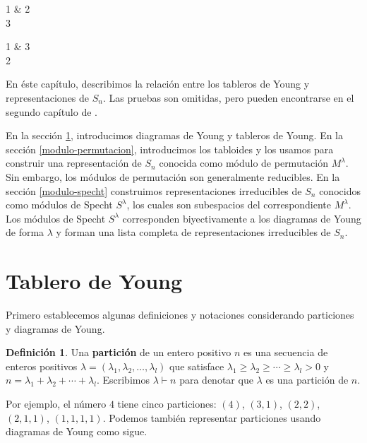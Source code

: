\documentclass[12pt]{book}
\theoremstyle{definition}
\newtheorem{definition}[theorem]{Definición}
\newcounter{in}
\newcounter{ini}
\begin{document}
\begin{center}
  \begin{ytableau}
    1 & 2\\
    3
  \end{ytableau} \qquad
  \begin{ytableau}
    1 & 3\\
    2
  \end{ytableau}
\end{center}

En éste capítulo, describimos la relación entre los tableros de Young
y representaciones de $S_{n}$. Las pruebas son omitidas, pero pueden
encontrarse en el segundo capítulo de \cite{sagan2001symmetric}.

En la sección \ref{tablero}, introducimos diagramas de Young y tableros
de Young. En la sección \ref{modulo-permutacion}, introducimos los
tabloides y los usamos para construir una representación de $S_{n}$
conocida como módulo de permutación $M^{\lambda}$. Sin embargo, los
módulos de permutación son generalmente reducibles. En la sección
\ref{modulo-specht} construimos representaciones irreducibles de
$S_{n}$ conocidos como módulos de Specht $S^{\lambda}$, los cuales son
subespacios del correspondiente $M^{\lambda}$. Los módulos de
Specht $S^{\lambda}$ corresponden biyectivamente a los diagramas de
Young de forma $\lambda$ y forman una lista completa de
representaciones irreducibles de $S_{n}$.

\section{Tablero de Young}
\label{tablero}

Primero establecemos algunas definiciones y notaciones
considerando particiones y diagramas de Young.

\begin{definition}
  Una \textbf{partición} de un entero positivo $n$ es una secuencia de
  enteros positivos
  $\lambda=(\lambda_{1},\lambda_{2},\ldots,\lambda_{l})$ que satisface
  $\lambda_{1}\geq\lambda_{2}\geq\cdots\geq\lambda_{l}>0$ y
  $n=\lambda_{1}+\lambda_{2}+\cdots+\lambda_{l}$. Escribimos
  $\lambda\vdash n$ para denotar que $\lambda$ es una partición de $n$.
\end{definition}

Por ejemplo, el número $4$ tiene cinco particiones: $(4)$, $(3,1)$,
$(2,2)$, $(2,1,1)$, $(1,1,1,1)$. Podemos también representar
particiones usando diagramas de Young como sigue.
\end{document}
